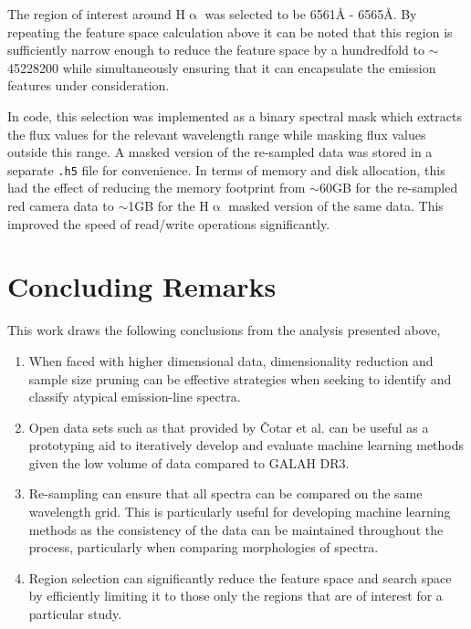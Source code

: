 The region of interest around H$\upalpha$ was selected to be 6561\r{A} - 6565\r{A}\cite{traven2017galah}. By repeating the feature space calculation above it can be noted that this region is sufficiently narrow enough to reduce the feature space by a hundredfold to $\sim$ \num[round-precision=2,round-mode=figures, scientific-notation=true]{45228200} while simultaneously ensuring that it can encapsulate the emission features under consideration. 

In code, this selection was implemented as a binary spectral mask which extracts the flux values for the relevant wavelength range while masking flux values outside this range. A masked version of the re-sampled data was stored in a separate \texttt{.h5} file for convenience. In terms of memory and disk allocation, this had the effect of reducing the memory footprint from $\sim$60GB for the re-sampled red camera data to $\sim$1GB for the H$\upalpha$ masked version of the same data. This improved the speed of read/write operations significantly. 

\section{Concluding Remarks}

This work draws the following conclusions from the analysis presented above,

\begin{enumerate}
\item When faced with higher dimensional data, dimensionality reduction and sample size pruning can be effective strategies when seeking to identify and classify atypical emission-line spectra. 

\item Open data sets such as that provided by Čotar et al. can be useful as a prototyping aid to iteratively develop and evaluate machine learning methods given the low volume of data compared to GALAH DR3. 

\item Re-sampling can ensure that all spectra can be compared on the same wavelength grid. This is particularly useful for developing machine learning methods as the consistency of the data can be maintained throughout the process, particularly when comparing morphologies of spectra.  

\item Region selection can significantly reduce the feature space and search space by efficiently limiting it to those only the regions that are of interest for a particular study. 
\end{enumerate}

